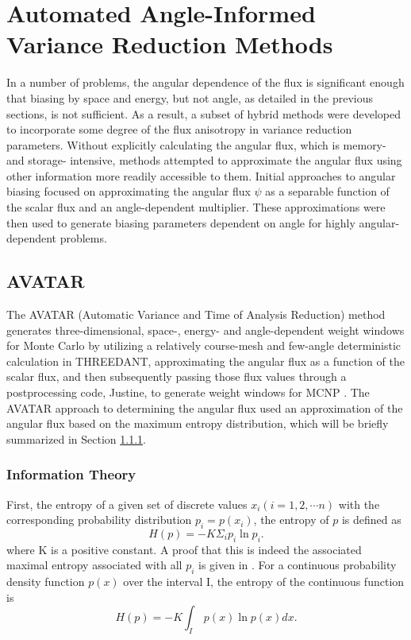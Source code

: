 \section{Automated Angle-Informed Variance Reduction Methods}
\label{sec:AngleVR}

In a number of problems, the angular dependence of the flux is significant enough that
biasing by space and energy, but not angle, as detailed in the previous
sections, is not
sufficient. As a result, a subset of hybrid methods were developed to incorporate some
degree of the flux anisotropy in variance reduction parameters. Without explicitly
calculating the angular flux, which is memory- and storage- intensive, methods
attempted to approximate the angular flux using other information more readily
accessible to them.
Initial approaches
to angular biasing focused on approximating the angular flux $\psi$ as a separable
function of the scalar flux and an angle-dependent multiplier.
These approximations were then used to generate biasing
parameters dependent on angle for highly angular-dependent problems.

\subsection{AVATAR}

The AVATAR \cite{van_riper_generation_1995, van_riper_avatarautomatic_1997}
(Automatic Variance and Time of Analysis Reduction) method generates
three-dimensional, space-, energy- and angle-dependent weight windows for Monte
Carlo by
utilizing a relatively course-mesh and few-angle deterministic calculation in
THREEDANT, approximating the angular flux as a function of the scalar flux, and
then subsequently passing those flux values through a postprocessing
code, Justine, to generate
weight windows for MCNP \cite{mcnp_manual_v1}. The AVATAR approach to
determining the angular flux used an approximation of the angular flux based on
the maximum entropy distribution, which will be briefly summarized in Section
\ref{subsubsec:ITheory}.

\subsubsection{Information Theory}
\label{subsubsec:ITheory}

First, the entropy of a given set of discrete values $x_i (i=1,2, \cdots n)$
with the corresponding probability distribution $p_i = p(x_i)$, the entropy of
$p$ is defined as
\begin{equation}
  H(p) = - K \Sigma_i p_i \ln p_i .
  \label{eq:entropy}
\end{equation}
where K is a positive constant. A proof that this is indeed the associated
maximal entropy associated with all $p_i$ is given in
\cite{jaynes_information_1957}.
For a continuous probability density function $p(x)$ over the interval I, the
entropy of the continuous function is
\begin{equation}
  H(p) = - K \int_I\ p(x) \ln p(x) dx .
\end{equation}


